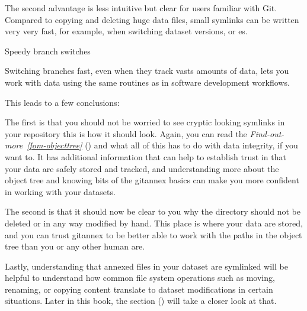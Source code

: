 \sphinxAtStartPar
The second advantage is less intuitive but clear for users familiar with Git.
Compared to copying and deleting huge data files, small symlinks can be written very very fast, for example, when switching dataset versions, or {\hyperref[\detokenize{glossary:term-branch}]{}}es.
\begin{gitusernote}[before title={\thetcbcounter\ }, check odd page=true]{Speedy branch switches}

\sphinxAtStartPar
Switching branches fast, even when they track vasts amounts of data, lets you work with data using the same routines as in software development workflows.


\end{gitusernote}

\sphinxAtStartPar
This leads to a few conclusions:

\sphinxAtStartPar
The first is that you should not be worried
to see cryptic looking symlinks in your repository \textendash{} this is how it should look.
Again, you can read the \textit{Find-out-more}~{\findoutmoreiconinline}\textit{\ref{fom-objecttree}} {\hyperref[\detokenize{basics/101-115-symlinks:fom-objecttree}]{}} () and what all of this has to do with data integrity, if you want to.
It has additional information that can help to establish trust in that your data are safely stored and tracked, and understanding more about the object tree and knowing bits of the git\sphinxhyphen{}annex basics can make you more confident in working with your datasets.

\sphinxAtStartPar
The second is that it should now be clear to you why the  directory
should not be deleted or in any way modified by hand. This place is where
your data are stored, and you can trust git\sphinxhyphen{}annex to be better able to
work with the paths in the object tree than you or any other human are.

\sphinxAtStartPar
Lastly, understanding that annexed files in your dataset are symlinked
will be helpful to understand how common file system operations such as
moving, renaming, or copying content translate to dataset modifications
in certain situations. Later in this book, the section {\hyperref[\detokenize{basics/101-136-filesystem:file-system}]{}} ()
will take a closer look at that.

